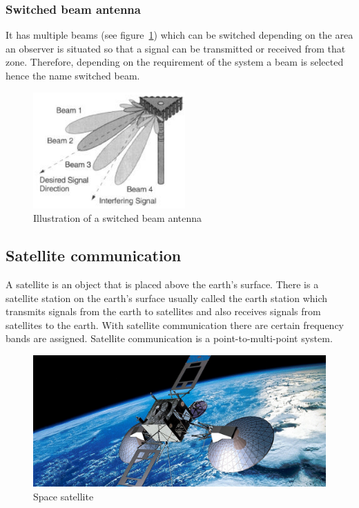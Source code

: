 \subsubsection{Switched beam antenna}
It has multiple beams (see figure~\ref{fig:switchedbeam}) which can be switched depending on the area an observer is situated so that a signal can be transmitted or received from that zone. Therefore, depending on the requirement of the system a beam is selected hence the name switched beam.
\begin{figure}[h]
\centering
\includegraphics[scale=0.7]{./graphics/switchedbeam}
\caption{Illustration of a switched beam antenna}
\label{fig:switchedbeam}
\end{figure} 


\subsection{Satellite communication}
A satellite is an object that is placed above the earth's surface. There is a satellite station on the earth's surface usually called the earth station which transmits signals from the earth to satellites and also receives signals from satellites to the earth. With satellite communication there are certain frequency bands are assigned. Satellite communication is a point-to-multi-point system.

\begin{figure}[h]
\centering
\includegraphics[scale=0.2]{./graphics/satellite}
\caption{Space satellite}
\end{figure}

